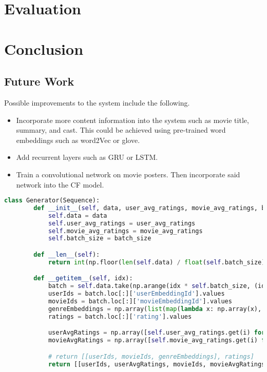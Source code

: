 \documentclass[12pt]{elsarticle}
\begin{document}
\section{Evaluation}


\section{Conclusion}
\subsection{Future Work}
Possible improvements to the system include the following.
\begin{itemize}
    \item Incorporate more content information into the system such as movie title, summary, and cast. This could be achieved using pre-trained word embeddings such as word2Vec or glove.
    \item Add recurrent layers such as GRU or LSTM.
    \item Train a convolutional network on movie posters. Then incorporate said network into the CF model.
\end{itemize}


\newpage
\appendix
\begin{lstlisting}[language=Python]
    class Generator(Sequence):
        def __init__(self, data, user_avg_ratings, movie_avg_ratings, batch_size):
            self.data = data
            self.user_avg_ratings = user_avg_ratings
            self.movie_avg_ratings = movie_avg_ratings
            self.batch_size = batch_size

        def __len__(self):
            return int(np.floor(len(self.data) / float(self.batch_size)))

        def __getitem__(self, idx):
            batch = self.data.take(np.arange(idx * self.batch_size, (idx + 1) * self.batch_size, 1), 0)
            userIds = batch.loc[:]['userEmbeddingId'].values
            movieIds = batch.loc[:]['movieEmbeddingId'].values
            genreEmbeddings = np.array(list(map(lambda x: np.array(x), batch.loc[:]['genreEmbedding'].values)))
            ratings = batch.loc[:]['rating'].values

            userAvgRatings = np.array([self.user_avg_ratings.get(i) for i in userIds.tolist()])
            movieAvgRatings = np.array([self.movie_avg_ratings.get(i) for i in movieIds.tolist()])

            # return [[userIds, movieIds, genreEmbeddings], ratings]
            return [[userIds, userAvgRatings, movieIds, movieAvgRatings, genreEmbeddings], ratings]
\end{lstlisting}
\end{document}
